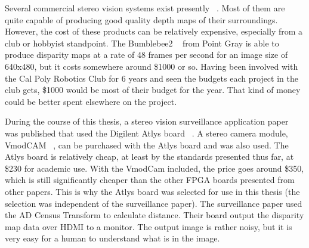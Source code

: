 Several commercial stereo vision systems exist presently ~\cite{similarAlgorithms}. Most of them are quite capable of producing good quality depth maps of their surroundings. However, the cost of these products can be relatively expensive, especially from a club or hobbyist standpoint. The Bumblebee2 ~\cite{bumblebee} from Point Gray is able to produce disparity maps at a rate of 48 frames per second for an image size of 640x480, but it costs somewhere around \$1000 or so. Having been involved with the Cal Poly Robotics Club for 6 years and seen the budgets each project in the club gets, \$1000 would be most of their budget for the year. That kind of money could be better spent elsewhere on the project.

During the course of this thesis, a stereo vision surveillance application paper ~\cite{surveillance} was published that used the Digilent Atlys board ~\cite{atlysBoard}. A stereo camera module, VmodCAM ~\cite{vmodcam}, can be purchased with the Atlys board and was also used. The Atlys board is relatively cheap, at least by the standards presented thus far, at \$230 for academic use. With the VmodCam included, the price goes around \$350, which is still significantly cheaper than the other FPGA boards presented from other papers. This is why the Atlys board was selected for use in this thesis (the selection was independent of the surveillance paper). The surveillance paper used the AD Census Transform to calculate distance. Their board output the disparity map data over HDMI to a monitor. The output image is rather noisy, but it is very easy for a human to understand what is in the image.